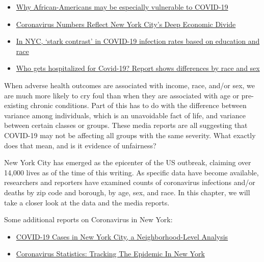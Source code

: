 \documentclass[openany]{book}
\providecommand{\tightlist}{%
  \setlength{\itemsep}{0pt}\setlength{\parskip}{0pt}}
\begin{document}
\begin{itemize}
\item
  \href{https://www.sciencenews.org/article/coronavirus-why-african-americans-vulnerable-covid-19-health-race}{Why African-Americans may be especially vulnerable to COVID-19}
\item
  \href{https://theintercept.com/2020/04/09/nyc-coronavirus-deaths-race-economic-divide/}{Coronavirus Numbers Reflect New York City's Deep Economic Divide}
\item
  \href{https://abcnews.go.com/Health/nyc-stark-contrast-covid-19-infection-rates-based/story?id=69920706}{In NYC, `stark contrast' in COVID-19 infection rates based on education and race}
\item
  \href{https://www.statnews.com/2020/04/09/hospitalized-covid-19-patients-differences-by-race-and-sex/}{Who gets hospitalized for Covid-19? Report shows differences by race and sex}
\end{itemize}

When adverse health outcomes are associated with income, race, and/or sex, we are much more likely to cry foul than when they are associated with age or pre-existing chronic conditions. Part of this has to do with the difference between variance among individuals, which is an unavoidable fact of life, and variance between certain classes or groups. These media reports are all suggesting that COVID-19 may not be affecting all groups with the same severity. What exactly does that mean, and is it evidence of unfairness?

New York City has emerged as the epicenter of the US outbreak, claiming over 14,000 lives as of the time of this writing. As specific data have become available, researchers and reporters have examined counts of coronavirus infections and/or deaths by zip code and borough, by age, sex, and race. In this chapter, we will take a closer look at the data and the media reports.

Some additional reports on Coronavirus in New York:

\begin{itemize}
\tightlist
\item
  \href{https://furmancenter.org/thestoop/entry/covid-19-cases-in-new-york-city-a-neighborhood-level-analysis}{COVID-19 Cases in New York City, a Neighborhood-Level Analysis}
\item
  \href{https://gothamist.com/news/coronavirus-statistics-tracking-epidemic-new-york}{Coronavirus Statistics: Tracking The Epidemic In New York}
\end{itemize}
\end{document}
